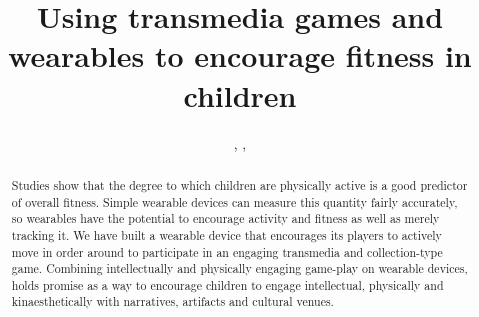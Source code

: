 \documentclass{SIGCHI2015LaTex/sigchi}
\begin{document}
\title{Using transmedia games and wearables to encourage fitness in children}


\author{
, 
,
}




\maketitle

\begin{abstract}

Studies show that the degree to which children are physically active is a good predictor of overall fitness. Simple wearable devices can measure this quantity fairly accurately, so wearables have the potential to encourage activity and fitness as well as merely tracking it. We have built a wearable device that encourages its players to actively move in order around to participate in an engaging transmedia and collection-type game. Combining intellectually and physically engaging game-play on wearable devices, holds promise as a way to encourage children to engage intellectual, physically and kinaesthetically with narratives, artifacts and cultural venues.

\end{abstract}
\end{document}
